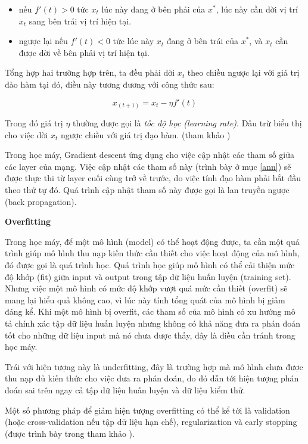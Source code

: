 \begin{itemize}
    \item nếu $f'(t)>0$ tức $x_t$ lúc này đang ở bên phải của $x^*$, lúc này cần dời vị trí $x_t$ sang bên trái vị trí hiện tại.
    \item ngược lại nếu $f'(t)<0$ tức lúc này $x_t$ đang ở bên trái của $x^*$, và $x_t$ cần được dời về bên phải vị trí hiện tại.
\end{itemize}

Tổng hợp hai trường hợp trên, ta đều phải dời $x_t$ theo chiều ngược lại với giá trị đào hàm tại đó, điều này tương đương với công thức sau:

\begin{equation}
    x_(t+1) = x_t - \eta f'(t)
\end{equation}

Trong đó giá trị $\eta$ thường được gọi là \textit{tốc độ học (learning rate)}. Dấu trừ biểu thị cho việc dời $x_t$ ngược chiều với giá trị đạo hàm. (tham khảo \cite{tiep2018machine})

Trong học máy, Gradient descent ứng dụng cho việc cập nhật các tham số giữa các layer của mạng. Việc cập nhật các tham số này (trình bày ở mục \ref{ann}) sẽ được thực thi từ layer cuối cùng trở về trước, do việc tính đạo hàm phải bắt đầu theo thứ tự đó. Quá trình cập nhật tham số  này được gọi là lan truyền ngược (back propagation).

\textbf{Overfitting}

Trong học máy, để một mô hình (model) có thể hoạt động được, ta cần một quá trình giúp mô hình thu nạp kiến thức cần thiết cho việc hoạt động của mô hình, đó được gọi là quá trình học. Quá trình học giúp mô hình có thể cải thiện mức độ khớp (fit) giữa input và output trong tập dữ liệu huấn luyện (training set). Nhưng việc một mô hình có mức độ khớp vượt quá mức cần thiết (overfit) sẽ mang lại hiểu quả không cao, vì lúc này tính tổng quát của mô hình bị giảm đáng kể. Khi một mô hình bị overfit, các tham số của mô hình có xu hướng mô tả chính xác tập dữ liệu huấn luyện nhưng không có khả năng đưa ra phán đoán tốt cho những dữ liệu input mà nó chưa được thấy, đây là điều cần tránh trong học máy.

Trái với hiện tượng này là underfitting, đây là trường hợp mà mô hình chưa được thu nạp đủ kiến thức cho việc đưa ra phán đoán, do đó dẫn tới hiện tượng phán đoán sai trên ngay cả tập dữ liệu huấn luyện và dữ liệu kiểm thử.

Một số phương pháp để giảm hiện tượng overfitting có thể kể tới là validation (hoặc cross-validation nếu tập dữ liệu hạn chế), regularization và early stopping (được trình bày trong tham khảo \cite{tiep2018machine}).


